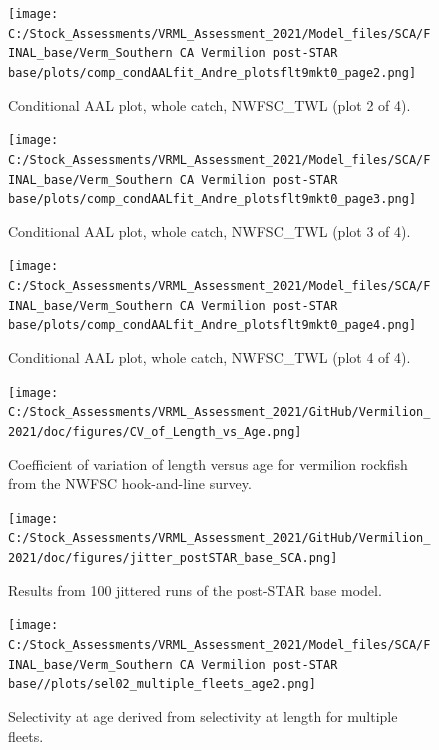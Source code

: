 \documentclass[
  english,
  a4paper,
]{article}
\begin{document}
\begin{figure}
\centering
\texttt{[image: C:/Stock\_Assessments/VRML\_Assessment\_2021/Model\_files/SCA/FINAL\_base/Verm\_Southern CA Vermilion post-STAR base/plots/comp\_condAALfit\_Andre\_plotsflt9mkt0\_page2.png]}
\caption{Conditional AAL plot, whole catch, NWFSC\_TWL (plot 2 of 4).\label{fig:comp_condAALfit_Andre_plotsflt9mkt0_page2}}
\end{figure}

\begin{figure}
\centering
\texttt{[image: C:/Stock\_Assessments/VRML\_Assessment\_2021/Model\_files/SCA/FINAL\_base/Verm\_Southern CA Vermilion post-STAR base/plots/comp\_condAALfit\_Andre\_plotsflt9mkt0\_page3.png]}
\caption{Conditional AAL plot, whole catch, NWFSC\_TWL (plot 3 of 4).\label{fig:comp_condAALfit_Andre_plotsflt9mkt0_page3}}
\end{figure}

\begin{figure}
\centering
\texttt{[image: C:/Stock\_Assessments/VRML\_Assessment\_2021/Model\_files/SCA/FINAL\_base/Verm\_Southern CA Vermilion post-STAR base/plots/comp\_condAALfit\_Andre\_plotsflt9mkt0\_page4.png]}
\caption{Conditional AAL plot, whole catch, NWFSC\_TWL (plot 4 of 4).\label{fig:comp_condAALfit_Andre_plotsflt9mkt0_page4}}
\end{figure}

\FloatBarrier

\FloatBarrier

\begin{figure}
\centering
\texttt{[image: C:/Stock\_Assessments/VRML\_Assessment\_2021/GitHub/Vermilion\_2021/doc/figures/CV\_of\_Length\_vs\_Age.png]}
\caption{Coefficient of variation of length versus age for vermilion rockfish from the NWFSC hook-and-line survey.\label{fig:cv-length-age}}
\end{figure}

\begin{figure}
\centering
\texttt{[image: C:/Stock\_Assessments/VRML\_Assessment\_2021/GitHub/Vermilion\_2021/doc/figures/jitter\_postSTAR\_base\_SCA.png]}
\caption{Results from 100 jittered runs of the post-STAR base model.\label{fig:jitter}}
\end{figure}

\clearpage
\FloatBarrier

\FloatBarrier

\begin{figure}
\centering
\texttt{[image: C:/Stock\_Assessments/VRML\_Assessment\_2021/Model\_files/SCA/FINAL\_base/Verm\_Southern CA Vermilion post-STAR base//plots/sel02\_multiple\_fleets\_age2.png]}
\caption{Selectivity at age derived from selectivity at length for multiple fleets.\label{fig:selex-age-all}}
\end{figure}
\end{document}
